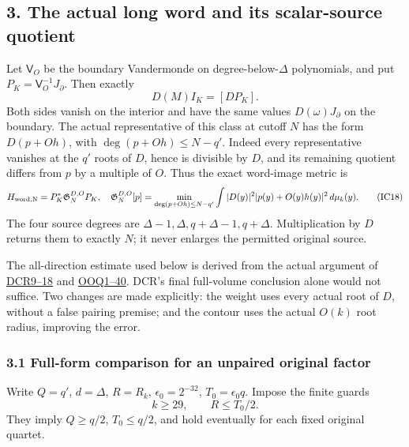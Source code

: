 \documentclass[11pt]{article}
\begin{document}
\subsection{3. The actual long word and its scalar-source quotient}\label{the-actual-long-word-and-its-scalar-source-quotient}

Let \(\mathsf V_O\) be the boundary Vandermonde on degree-below-\(\Delta\) polynomials, and put \(P_K=\mathsf V_O^{-1}J_\partial\). Then exactly \[
D(M)I_K=[DP_K].
\tag{IC17}
\] Both sides vanish on the interior and have the same values \(D(\omega)J_\partial\) on the boundary. The actual representative of this class at cutoff \(N\) has the form \(D(p+Oh)\), with \(\deg(p+Oh)\le N-q'\). Indeed every representative vanishes at the \(q'\) roots of \(D\), hence is divisible by \(D\), and its remaining quotient differs from \(p\) by a multiple of \(O\). Thus the exact word-image metric is \[
H_{\rm word,N}=P_K^*\mathfrak G_N^{D,O}P_K,\quad
\mathfrak G_N^{D,O}[p]=
\min_{\deg(p+Oh)\le N-q'}\int|D(y)|^2|p(y)+O(y)h(y)|^2\,d\mu_k(y).
\tag{IC18}
\] The four source degrees are \(\Delta-1,\Delta,q+\Delta-1,q+\Delta\). Multiplication by \(D\) returns them to exactly \(N\); it never enlarges the permitted original source.

The all-direction estimate used below is derived from the actual argument of \href{https://github.com/KokunoYumeto/zeta-function-research-reader/blob/7230c00b9f07dd222b2aea95427d67918f3a8cac/workbenches/splitzero-tandem/continuations/20260921-local-covariance-activation/009/CONDUCTOR_DIVISOR_COVARIANCE_RETURN.tex\#L139}{DCR9--18} and \href{https://github.com/KokunoYumeto/zeta-function-research-reader/blob/5992ad50c0f2a06921f1fcaded7b4e38097c0739/workbenches/splitzero-tandem/continuations/20260920-original-kernel-mixed-determinants/providers/09_INPUT_CUMULATIVE_PROOFS.tex\#L23179}{OOQ1--40}. DCR's final full-volume conclusion alone would not suffice. Two changes are made explicitly: the weight uses every actual root of \(D\), without a false pairing premise; and the contour uses the actual \(O(k)\) root radius, improving the error.

\subsubsection{3.1 Full-form comparison for an unpaired original factor}\label{full-form-comparison-for-an-unpaired-original-factor}

Write \(Q=q'\), \(d=\Delta\), \(R=R_k\), \(\epsilon_0=2^{-32}\), \(T_0=\epsilon_0q\). Impose the finite guards \[
k\ge29,\qquad R\le T_0/2.
\tag{IC19}
\] They imply \(Q\ge q/2\), \(T_0\le q/2\), and hold eventually for each fixed original quartet.
\end{document}
